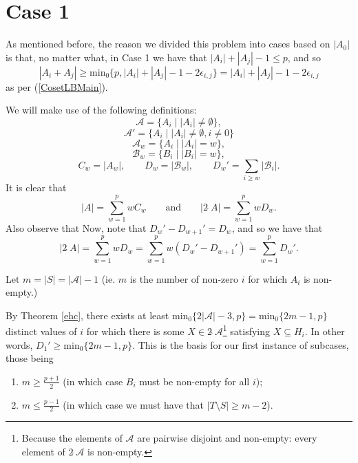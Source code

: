 \documentclass[a4paper, 12pt]{article}\usepackage[english]{babel}
\newcommand{\minz}{\mathrm{min}_0}
\newcommand{\A}{\mathcal{A}}
\newcommand{\B}{\mathcal{B}}
\newcommand{\<}{\langle}
\begin{document}
\section{Case 1}

As mentioned before, the reason we divided this problem into cases based on $|A_0|$ is that, no matter what, in Case 1 we have that $|A_i|+|A_j|-1\leq p$, and so \[|A_i+A_j|\geq \minz\{p,|A_i|+|A_j|-1-2\epsilon_{i,j}\}=|A_i|+|A_j|-1-2\epsilon_{i,j}\] as per (\ref{CosetLBMain}).

We will make use of the following definitions:
\[\A=\{A_i\mid |A_i|\neq \emptyset\},\]
\[\A'=\{A_i\mid |A_i|\neq \emptyset,i\neq0\}\]
\[\A_w=\{A_i\mid |A_i|=w\},\]
\[\B_w=\{B_i\mid |B_i|=w\},\]
\[C_w=|A_w|,\quad\quad D_w=|\B_w|,\quad\quad D_w'=\sum_{i\geq w}|\B_i|.\]
It is clear that \[|A|=\sum_{w=1}^{p}wC_w\quad\quad\text{and}\quad\quad|2\hat{\;}A|=\sum_{w=1}^{p}wD_w.\] Also observe that 
Now, note that $D_{w}'-D_{w+1}'=D_w$, and so we have that \begin{equation}
    \label{dSum}|2\hat{\;}A|=\sum_{w=1}^{p}wD_w=\sum_{w=1}^{p}w(D_{w}'-D_{w+1}')=\sum_{w=1}^{p}D_w'.
\end{equation}

Let $m=|S|=|\mathcal{A}|-1$ (ie. $m$ is the number of non-zero $i$ for which $A_i$ is non-empty.)

By Theorem \ref{ehc}, there exists at least $\minz\{2|\A|-3,p\}=\minz\{2m-1,p\}$ distinct values of $i$ for which there is some $X\in 2\hat{\;}\A$\footnote{Because the elements of $\A$ are pairwise disjoint and non-empty: every element of $2\hat{\;}\A$ is non-empty.} satisfying $X\subseteq H_i$. In other words, $D_1'\geq \minz\{2m-1,p\}$. This is the basis for our first instance of subcases, those being

\begin{enumerate}[label=(1\Alph*)]
    \item $m\geq \frac{p+1}{2}$ (in which case $B_i$ must be non-empty for all $i$);
    \item $m\leq \frac{p-1}{2}$ (in which case we must have that $|T\setminus S|\geq m-2$).
\end{enumerate}
\end{document}
